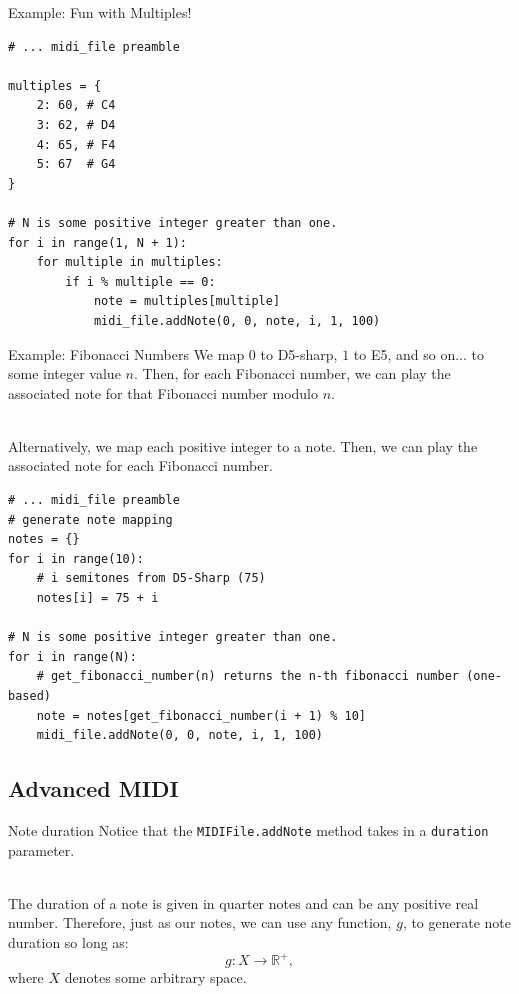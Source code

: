 \documentclass{beamer}
\begin{document}
\begin{frame}{Example: Fun with Multiples!}

\framebreak

\begin{center}
\begin{lstlisting}[language=iPython]
# ... midi_file preamble

multiples = {
    2: 60, # C4
    3: 62, # D4
    4: 65, # F4
    5: 67  # G4
}

# N is some positive integer greater than one.
for i in range(1, N + 1):
    for multiple in multiples:
        if i % multiple == 0:
            note = multiples[multiple]
            midi_file.addNote(0, 0, note, i, 1, 100)
\end{lstlisting}
\end{center}
\end{frame}

\begin{frame}{Example: Fibonacci Numbers}
We map $0$ to D5-sharp, $1$ to E5, and so on... to some integer value $n$. Then, for each Fibonacci number, we can play the associated note for that Fibonacci number modulo $n$.\\~\

Alternatively, we map each positive integer to a note. Then, we can play the associated note for each Fibonacci number.
\framebreak
\begin{center}
\begin{lstlisting}[language=iPython]
# ... midi_file preamble
# generate note mapping
notes = {}
for i in range(10):
    # i semitones from D5-Sharp (75)
    notes[i] = 75 + i

# N is some positive integer greater than one.
for i in range(N):
    # get_fibonacci_number(n) returns the n-th fibonacci number (one-based)
    note = notes[get_fibonacci_number(i + 1) % 10]
    midi_file.addNote(0, 0, note, i, 1, 100)
\end{lstlisting}
\end{center}
\end{frame}

\subsection{Advanced MIDI}
\begin{frame}{Note duration}
Notice that the \lstinline[language=iPython]{MIDIFile.addNote} method takes in a \lstinline[language=iPython]{duration} parameter.\\~\

The duration of a note is given in quarter notes and can be any positive real number. Therefore, just as our notes, we can use any function, $g$, to generate note duration so long as:
$$g : X \to \mathbb{R}^{+},$$
where $X$ denotes some arbitrary space.
\end{frame}
\end{document}

